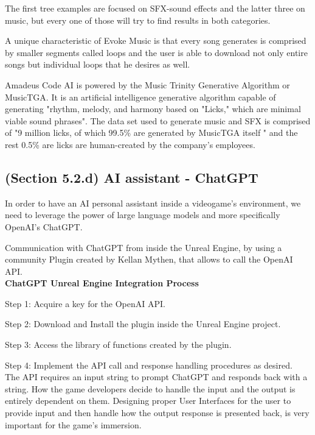 \documentclass[a4paper,one side,12pt]{book}
\begin{document}
The first tree examples are focused on SFX-sound effects and the latter
three on music, but every one of those will try to find results in both
categories.

A unique characteristic of Evoke Music is that every song generates is
comprised by smaller segments called loops and the user is able to
download not only entire songs but individual loops that he desires as
well.

Amadeus Code AI is powered by the Music Trinity Generative Algorithm or
MusicTGA. It is an artificial intelligence generative algorithm capable
of generating "rhythm, melody, and harmony based on "Licks," which
are minimal viable sound phrases". The data set used to generate music
and SFX is comprised of "9 million licks, of which 99.5\% are generated
by MusicTGA itself " \cite{Amadeus} and the rest 0.5\% are licks are
human-created by the company's employees.

\subsection{(Section 5.2.d) AI assistant - ChatGPT }

In order to have an AI personal assistant inside a videogame's
environment, we need to leverage the power of large language models and
more specifically OpenAI's ChatGPT. \cite{openai_chatgpt}

Communication with ChatGPT from inside the Unreal Engine, by using a
community Plugin created by Kellan Mythen, that allows to call the
OpenAI API. \cite{mythen_2023_openai}\\

\textbf{{ChatGPT Unreal Engine Integration Process}}

Step 1: Acquire a key for the OpenAI API.

Step 2: Download and Install the plugin inside the Unreal Engine
project.

Step 3: Access the library of functions created by the plugin.

Step 4: Implement the API call and response handling procedures as
desired.\\

The API requires an input string to prompt ChatGPT and responds back
with a string. How the game developers decide to handle the input and
the output is entirely dependent on them. Designing proper User
Interfaces for the user to provide input and then handle how the output
response is presented back, is very important for the game's immersion.
\end{document}

